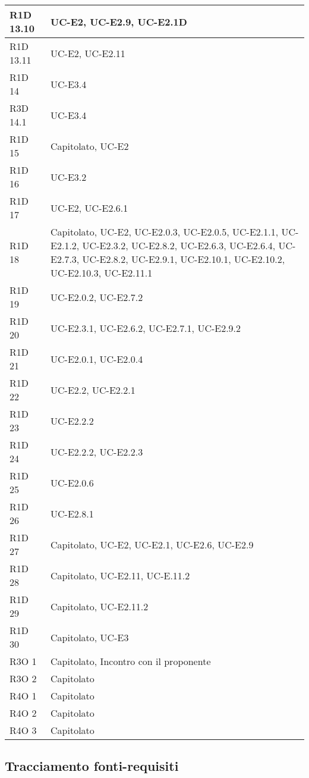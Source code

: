\begin{center}
\begin{longtable}{ | l | p{8cm} | }
    R1D 13.10 & UC-E2, UC-E2.9, UC-E2.1D \\ \hline
    R1D 13.11 & UC-E2, UC-E2.11 \\ \hline
    R1D 14 &  UC-E3.4  \\ \hline
    R3D 14.1 & UC-E3.4 \\ \hline
    R1D 15 & Capitolato, UC-E2  \\ \hline
    R1D 16 & UC-E3.2 \\ \hline
    R1D 17 & UC-E2, UC-E2.6.1 \\ \hline
    R1D 18 & Capitolato, UC-E2, UC-E2.0.3, UC-E2.0.5, UC-E2.1.1, UC-E2.1.2, UC-E2.3.2, UC-E2.8.2, UC-E2.6.3, UC-E2.6.4, UC-E2.7.3, UC-E2.8.2, UC-E2.9.1, UC-E2.10.1, UC-E2.10.2, UC-E2.10.3, UC-E2.11.1 \\ \hline
    R1D 19 & UC-E2.0.2, UC-E2.7.2 \\ \hline
    R1D 20 & UC-E2.3.1, UC-E2.6.2, UC-E2.7.1, UC-E2.9.2 \\ \hline
    R1D 21 & UC-E2.0.1, UC-E2.0.4 \\ \hline
    R1D 22 & UC-E2.2, UC-E2.2.1 \\ \hline
    R1D 23 & UC-E2.2.2 \\ \hline
    R1D 24 & UC-E2.2.2, UC-E2.2.3  \\ \hline
    R1D 25 & UC-E2.0.6  \\ \hline
    R1D 26 & UC-E2.8.1 \\ \hline
    R1D 27 & Capitolato, UC-E2, UC-E2.1, UC-E2.6, UC-E2.9 \\ \hline
    R1D 28 & Capitolato, UC-E2.11, UC-E.11.2 \\ \hline
    R1D 29 & Capitolato, UC-E2.11.2 \\ \hline
    R1D 30 & Capitolato, UC-E3 \\ \hline
    R3O 1 & Capitolato, Incontro con il proponente\\ \hline
    R3O 2 & Capitolato \\ \hline
    R4O 1 & Capitolato \\ \hline
    R4O 2 & Capitolato \\ \hline
    R4O 3 & Capitolato \\ \hline
    \end{longtable}
  \egroup
\end{center} 

\subsection{Tracciamento fonti-requisiti}

